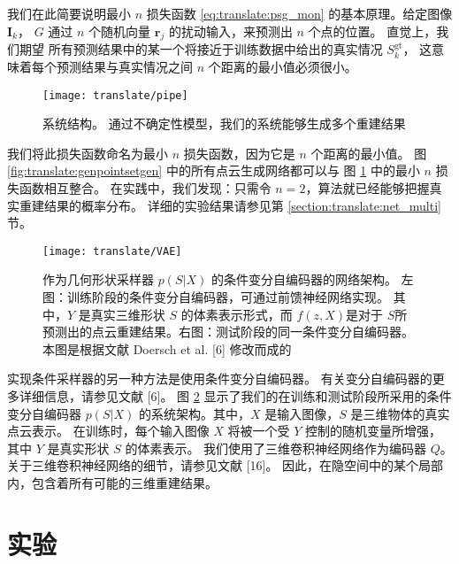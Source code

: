 我们在此简要说明最小 $n$ 损失函数 \eqref{eq:translate:psg_mon} 的基本原理。给定图像 $\bm I_k$，
$G$ 通过 $n$ 个随机向量 $\bm r_j$ 的扰动输入，来预测出 $n$ 个点的位置。
直觉上，我们期望
所有预测结果中的某一个将接近于训练数据中给出的真实情况 $S_k^{\text{gt}}$，
这意味着每个预测结果与真实情况之间 $n$ 个距离的最小值必须很小。



\begin{figure}[h]
	\centering
	\texttt{[image: translate/pipe]}
	\caption[]{
		系统结构。
		通过不确定性模型，我们的系统能够生成多个重建结果}
	\label{fig:translate:pipe}
\end{figure}



我们将此损失函数命名为最小 $n$ 损失函数，因为它是 $n$ 个距离的最小值。
图 \ref{fig:translate:genpointsetgen} 中的所有点云生成网络都可以与 图 \ref{fig:translate:pipe} 中的最小 $n$ 损失函数相互整合。
在实践中，我们发现：只需令 $n = 2$，算法就已经能够把握真实重建结果的概率分布。
详细的实验结果请参见第 \ref{section:translate:net_multi} 节。

\begin{figure}[h]
	\centering
	\texttt{[image: translate/VAE]}
	\caption[]{
		作为几何形状采样器 $p(S | X)$ 的条件变分自编码器的网络架构。 左图：训练阶段的条件变分自编码器，可通过前馈神经网络实现。
		其中，$Y$ 是真实三维形状 $S$ 的体素表示形式，而 $f(z, X)$是对于 $S$所预测出的点云重建结果。右图：测试阶段的同一条件变分自编码器。本图是根据文献 Doersch et al. [6] 修改而成的}
	\label{fig:translate:vae}
\end{figure}

实现条件采样器的另一种方法是使用条件变分自编码器。 有关变分自编码器的更多详细信息，请参见文献 [6]。
图 \ref{fig:translate:vae}
显示了我们的在训练和测试阶段所采用的条件变分自编码器 $p(S | X)$ 的系统架构。其中，$X$ 是输入图像，$S$ 是三维物体的真实点云表示。
在训练时，每个输入图像 $X$ 将被一个受 $Y$ %
控制的随机变量所增强，其中 $Y$ 是真实形状 $S$ 的体素表示。
我们使用了三维卷积神经网络作为编码器 $Q$。关于三维卷积神经网络的细节，请参见文献 [16]。 因此，在隐空间中的某个局部内，包含着所有可能的三维重建结果。











\section{实验}
